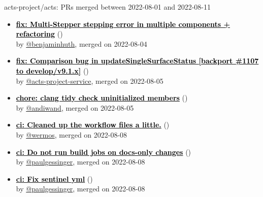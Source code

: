 \begin{frame}[allowframebreaks]{ acts-project/acts: PRs merged 
between 2022-08-01 and 2022-08-11
}
\begin{itemize}
    \item\prmerged\textbf{\href{https://github.com/acts-project/acts/pull/1339}{\textcolor{black}{fix: Multi-Stepper stepping error in multiple components + refactoring}}}
    (\href{https://github.com/acts-project/acts/pull/1339}{}) \\
    by \href{https://github.com/benjaminhuth}{@benjaminhuth}, merged on 2022-08-04

    \item\prmerged\textbf{\href{https://github.com/acts-project/acts/pull/1380}{\textcolor{black}{fix: Comparison bug in updateSingleSurfaceStatus [backport \#1107 to develop/v9.1.x]}}}
    (\href{https://github.com/acts-project/acts/pull/1380}{}) \\
    by \href{https://github.com/acts-project-service}{@acts-project-service}, merged on 2022-08-05

    \item\prmerged\textbf{\href{https://github.com/acts-project/acts/pull/1373}{\textcolor{black}{chore: clang tidy check uninitialized members}}}
    (\href{https://github.com/acts-project/acts/pull/1373}{}) \\
    by \href{https://github.com/andiwand}{@andiwand}, merged on 2022-08-05

    \item\prmerged\textbf{\href{https://github.com/acts-project/acts/pull/1384}{\textcolor{black}{ci: Cleaned up the workflow files a little.}}}
    (\href{https://github.com/acts-project/acts/pull/1384}{}) \\
    by \href{https://github.com/wermos}{@wermos}, merged on 2022-08-08

    \item\prmerged\textbf{\href{https://github.com/acts-project/acts/pull/1388}{\textcolor{black}{ci: Do not run build jobs on docs-only changes}}}
    (\href{https://github.com/acts-project/acts/pull/1388}{}) \\
    by \href{https://github.com/paulgessinger}{@paulgessinger}, merged on 2022-08-08

    \item\prmerged\textbf{\href{https://github.com/acts-project/acts/pull/1389}{\textcolor{black}{ci: Fix sentinel yml}}}
    (\href{https://github.com/acts-project/acts/pull/1389}{}) \\
    by \href{https://github.com/paulgessinger}{@paulgessinger}, merged on 2022-08-08


\end{itemize}
\end{frame}
